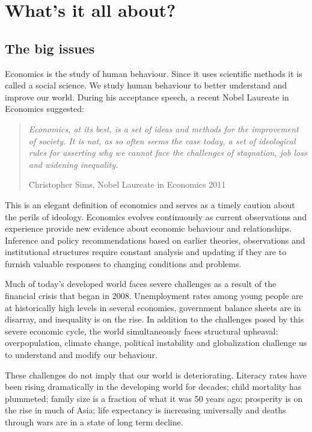 \section{What's it all about?}\label{sec:ch1sec1}

\subsection*{The big issues}

Economics is the study of human behaviour. Since it uses scientific methods it is called a social science. We study human behaviour to better understand and improve our world. During his acceptance speech, a recent Nobel Laureate in Economics suggested:

\begin{quote}
\textit{Economics, at its best, is a set of ideas and methods for the improvement of society. It is not, as so often seems the case today, a set of ideological rules for asserting why we cannot face the challenges of stagnation, job loss and widening inequality.}

Christopher Sims, Nobel Laureate in Economics 2011
\end{quote}

This is an elegant definition of economics and serves as a timely caution about the perils of ideology. Economics evolves continuously as current observations and experience provide new evidence about economic behaviour and relationships. Inference and policy recommendations based on earlier theories, observations and institutional structures require constant analysis and updating if they are to furnish valuable responses to changing conditions and problems. 

Much of today's developed world faces severe challenges as a result of the financial crisis that began in 2008. Unemployment rates among young people are at historically high levels in several economies, government balance sheets are in disarray, and inequality is on the rise. In addition to the challenges posed by this severe economic cycle, the world simultaneously faces structural upheaval: overpopulation, climate change, political instability and globalization challenge us to understand and modify our behaviour. 

These challenges do not imply that our world is deteriorating. Literacy rates have been rising dramatically in the developing world for decades; child mortality has plummeted; family size is a fraction of what it was 50 years ago; prosperity is on the rise in much of Asia; life expectancy is increasing universally and deaths through wars are in a state of long term decline.

